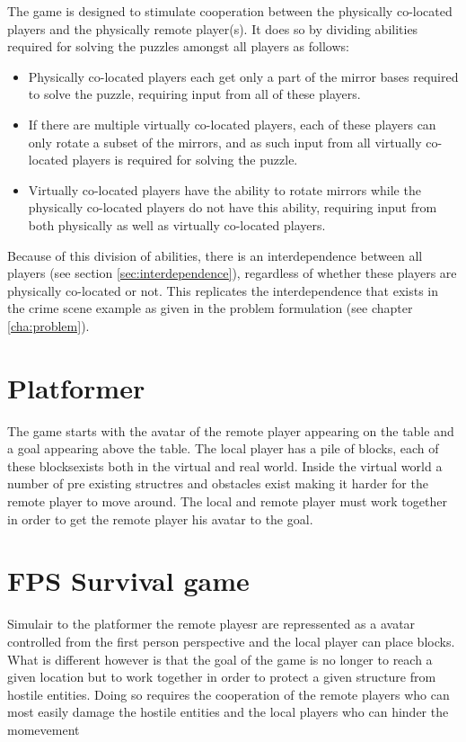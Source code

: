 	The game is designed to stimulate cooperation between the physically 
	co-located players and the physically remote player(s). It does so by 
	dividing abilities required for solving the puzzles amongst all players 
	as follows:
	
	\begin{itemize}
		\item Physically co-located players each get only a part of the 
		      mirror bases required to solve the puzzle, requiring input 
		      from all of these players.
		\item If there are multiple virtually co-located players, each of 
		      these players can only rotate a subset of the mirrors, and 
		      as such input from all virtually co-located players is 
		      required for solving the puzzle. 
		\item Virtually co-located players have the ability to rotate 
		      mirrors while the physically co-located players do not have 
		      this ability, requiring input from both physically as well
		      as virtually co-located players.
	\end{itemize}

	Because of this division of abilities, there is an interdependence 
	between all players (see section \ref{sec:interdependence}), regardless of
	whether these players are physically co-located or not. This replicates the 
	interdependence that exists in the crime scene example as given in the 
	problem formulation (see chapter \ref{cha:problem}).

\section{Platformer}
The game starts with the avatar of the remote player appearing on the table and a goal appearing above the table. The local player has a pile of blocks, each of these blocksexists both in the virtual and real world. 
Inside the virtual world a number of pre existing structres and obstacles exist making it harder for the remote player to move around. 
The local and remote player must work together in order to get the remote player his avatar to the goal. 


\section{FPS Survival game}
Simulair to the platformer the remote playesr are repressented as a avatar controlled from the first person perspective and the local player can place blocks. What is different however is that the goal of the game is no longer to reach a given location but to work together in order to protect a given structure from hostile entities. Doing so requires the cooperation of the remote players who can most easily damage the hostile entities and the local players who can hinder the momevement 

